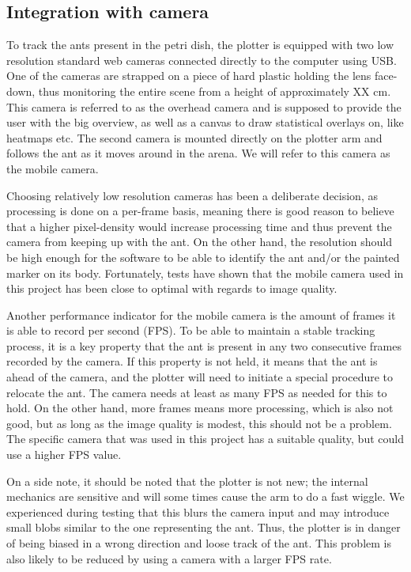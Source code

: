
\subsection{Integration with camera}

To track the ants present in the petri dish, the plotter is equipped with two low resolution standard web cameras connected directly to the computer using USB. One of the cameras are strapped on a piece of hard plastic holding the lens face-down, thus monitoring the entire scene from a height of approximately XX cm. This camera is referred to as the overhead camera and is supposed to provide the user with the big overview, as well as a canvas to draw statistical overlays on, like heatmaps etc. The second camera is mounted directly on the plotter arm and follows the ant as it moves around in the arena. We will refer to this camera as the mobile camera.

Choosing relatively low resolution cameras has been a deliberate decision, as processing is done on a per-frame basis, meaning there is good reason to believe that a higher pixel-density would increase processing time and thus prevent the camera from keeping up with the ant. On the other hand, the resolution should be high enough for the software to be able to identify the ant and/or the painted marker on its body. Fortunately, tests have shown that the mobile camera used in this project has been close to optimal with regards to image quality.

Another performance indicator for the mobile camera is the amount of frames it is able to record per second (FPS). To be able to maintain a stable tracking process, it is a key property that the ant is present in any two consecutive frames recorded by the camera. If this property is not held, it means that the ant is ahead of the camera, and the plotter will need to initiate a special procedure to relocate the ant. The camera needs at least as many FPS as needed for this to hold. On the other hand, more frames means more processing, which is also not good, but as long as the image quality is modest, this should not be a problem. The specific camera that was used in this project has a suitable quality, but could use a higher FPS value.

On a side note, it should be noted that the plotter is not new; the internal mechanics are sensitive and will some times cause the arm to do a fast wiggle. We experienced during testing that this blurs the camera input and may introduce small blobs similar to the one representing the ant. Thus, the plotter is in danger of being biased in a wrong direction and loose track of the ant. This problem is also likely to be reduced by using a camera with a larger FPS rate.

